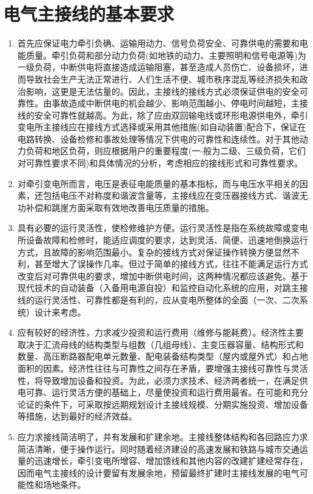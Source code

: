\section{电气主接线的基本要求}
\begin{enumerate}
	\item 首先应保证电力牵引负确、运输用动力、信号负荷安全、可靠供电的需要和电能质量。牵引负荷和部分动力负荷(如地铁的动力、主要照明和信号电源等)为一级负荷，中断供电将直接造成运输阻塞，甚至造成人员伤亡、设备损坏，进而导致社会生产无法正常进行、人们生活不便、城市秩序混乱等经济损失和政治影响，这更是无法估量的。因此，主接线的接线方式必须保证供电的安全可靠性。由事故造成中断供电的机会越少、影响范围越小、停电时间越短，主接线的安全可靠性就越高。为此，除了应由双回输电线或环形电源供电外，牵引变电所主接线应在接线方式选择或采用其他措施(如自动装置)配合下，保证在电路转换、设备检修和事故处理等情况下供电的可靠性和连续性。对于其他动力负荷和地区负荷，则应根据用户的重要程度(一-般为二级、三级负荷，它们对可靠性要求不同)和具体情况的分析，考虑相应的接线形式和可靠性要求。
	\item 对牵引变电所而言，电压是表征电能质量的基本指标，而与电压水平相关的因素，还包括电压不对称度和谐波含量等，主接线应在变压器接线方式、谐波无功补偿和跳崖方面采取有效地改善电压质量的措施。
	\item 具有必要的运行灵活性，使检修维护方便。运行灵活性是指在系统故障或变电所设备故障和检修时，能适应调度的要求，达到灵活、简便、迅速地倒换运行方式，且故障的影响范围最小。复杂的接线方式对保证操作转换方便显然不利，甚至增大了误操作几率。但过于简单的接线方式，往往不能满足运行方式改变后对可靠供电的要求，增加中断供电时间，这两种情况都应该避免。基于现代技术的自动装备（入备用电源自投）和监控自动化系统的应用，对跳主接线的运行灵活性、可靠性都是有利的，应从变电所整体的全面（一次、二次系统）设计来考虑。
	\item 应有较好的经济性，力求减少投资和运行费用（维修与能耗费）。经济性主要取决于汇流母线的结构类型与组数（几组母线）、主变压器容量、结构形式和数量、高压断路器配电单元数量、配电装备结构类型（屋内或屋外式）和占地面积的因素。经济性往往与可靠性之间存在矛盾，要增强主接线可靠性与灵活性，将导致增加设备和投资。为此，必须力求技术、经济两者统一，在满足供电可靠、运行灵活方便的基础上，尽量使投资和运行费用最省。在可能和充分论证的条件下，可采取按远期规划设计主接线规模、分期实施投资、增加设备等措施，达到最好的经济效益。
	\item 应力求接线简洁明了，并有发展和扩建余地。主接线整体结构和各回路应力求简洁清晰，便于操作运行。同时随着经济建设的高速发展和铁路与城市交通运量的迅速增长，牵引变电所增容、增加馈线和其他内容的改建扩建经常存在，因而电气主接线的设计要留有发展余地，预留最终扩建时主接线发展的电气可能性和场地条件。
\end{enumerate}


